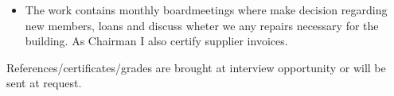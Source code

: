 \documentclass[10pt,a4paper,ragged2e]{altacv}
\begin{document}
\begin{fullwidth}
\divider

\begin{itemize}
  \item The work contains monthly boardmeetings where make decision regarding new members, 
  loans and discuss wheter we any repairs necessary for the building. As Chairman I also certify 
  supplier invoices.
\end{itemize}

\divider


\divider


\divider


References/certificates/grades are brought at interview opportunity or will be sent at request.

\end{fullwidth}
\end{document}
